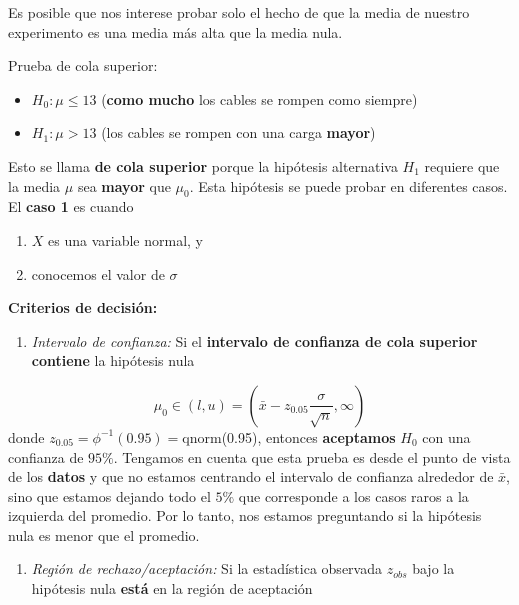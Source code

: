 \documentclass[
]{book}
\providecommand{\tightlist}{%
  \setlength{\itemsep}{0pt}\setlength{\parskip}{0pt}}
\begin{document}
Es posible que nos interese probar solo el hecho de que la media de nuestro experimento es una media más alta que la media nula.

Prueba de cola superior:

\begin{itemize}
\tightlist
\item
  \(H_0:\mu \leq 13\) (\textbf{como mucho} los cables se rompen como siempre)
\item
  \(H_1:\mu > 13\) (los cables se rompen con una carga \textbf{mayor})
\end{itemize}

Esto se llama \textbf{de cola superior} porque la hipótesis alternativa \(H_1\) requiere que la media \(\mu\) sea \textbf{mayor} que \(\mu_0\). Esta hipótesis se puede probar en diferentes casos. El \textbf{caso 1} es cuando

\begin{enumerate}
\def\labelenumi{\arabic{enumi}.}
\tightlist
\item
  \(X\) es una variable normal, y
\item
  conocemos el valor de \(\sigma\)
\end{enumerate}

\textbf{Criterios de decisión:}

\begin{enumerate}
\def\labelenumi{\arabic{enumi}.}
\tightlist
\item
  \emph{Intervalo de confianza:} Si el \textbf{intervalo de confianza de cola superior} \textbf{contiene} la hipótesis nula
\end{enumerate}

\[\mu_0\in (l,u)=(\bar{x}-z_{0.05} \frac{\sigma}{\sqrt{n}}, \infty)\]
donde \(z_{0.05}=\phi^{-1}(0.95)=\)qnorm(0.95), entonces \textbf{aceptamos} \(H_0\) con una confianza de \(95\%\). Tengamos en cuenta que esta prueba es desde el punto de vista de los \textbf{datos} y que no estamos centrando el intervalo de confianza alrededor de \(\bar{x}\), sino que estamos dejando todo el \(5\%\) que corresponde a los casos raros a la izquierda del promedio. Por lo tanto, nos estamos preguntando si la hipótesis nula es menor que el promedio.

\begin{enumerate}
\def\labelenumi{\arabic{enumi}.}
\setcounter{enumi}{1}
\tightlist
\item
  \emph{Región de rechazo/aceptación:} Si la estadística observada \(z_{obs}\) bajo la hipótesis nula \textbf{está} en la región de aceptación
\end{enumerate}
\end{document}
